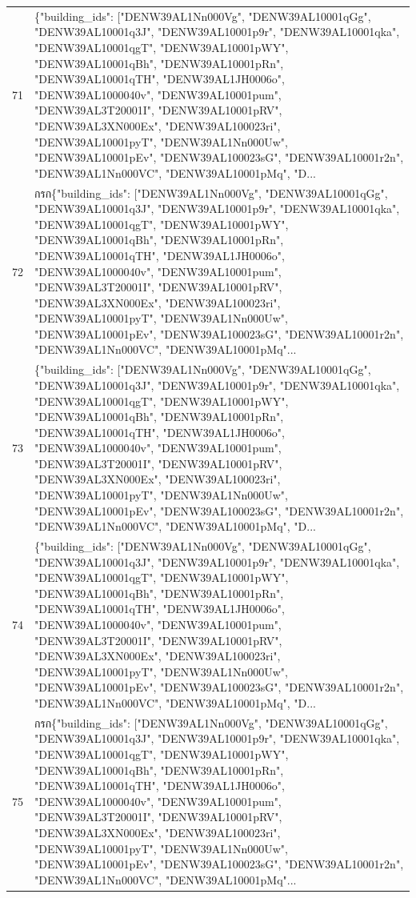 \documentclass[a4paper,11pt]{article}
\begin{document}
\begin{table}[ht]
\begin{tabular}{r p{12cm}}
71 & \{"building\_ids": ["DENW39AL1Nn000Vg", "DENW39AL10001qGg", "DENW39AL10001q3J", "DENW39AL10001p9r", "DENW39AL10001qka", "DENW39AL10001qgT", "DENW39AL10001pWY", "DENW39AL10001qBh", "DENW39AL10001pRn", "DENW39AL10001qTH", "DENW39AL1JH0006o", "DENW39AL1000040v", "DENW39AL10001pum", "DENW39AL3T20001I", "DENW39AL10001pRV", "DENW39AL3XN000Ex", "DENW39AL100023ri", "DENW39AL10001pyT", "DENW39AL1Nn000Uw", "DENW39AL10001pEv", "DENW39AL100023sG", "DENW39AL10001r2n", "DENW39AL1Nn000VC", "DENW39AL10001pMq", "D... \\
72 &  กรก\{"building\_ids": ["DENW39AL1Nn000Vg", "DENW39AL10001qGg", "DENW39AL10001q3J", "DENW39AL10001p9r", "DENW39AL10001qka", "DENW39AL10001qgT", "DENW39AL10001pWY", "DENW39AL10001qBh", "DENW39AL10001pRn", "DENW39AL10001qTH", "DENW39AL1JH0006o", "DENW39AL1000040v", "DENW39AL10001pum", "DENW39AL3T20001I", "DENW39AL10001pRV", "DENW39AL3XN000Ex", "DENW39AL100023ri", "DENW39AL10001pyT", "DENW39AL1Nn000Uw", "DENW39AL10001pEv", "DENW39AL100023sG", "DENW39AL10001r2n", "DENW39AL1Nn000VC", "DENW39AL10001pMq"... \\
73 & \{"building\_ids": ["DENW39AL1Nn000Vg", "DENW39AL10001qGg", "DENW39AL10001q3J", "DENW39AL10001p9r", "DENW39AL10001qka", "DENW39AL10001qgT", "DENW39AL10001pWY", "DENW39AL10001qBh", "DENW39AL10001pRn", "DENW39AL10001qTH", "DENW39AL1JH0006o", "DENW39AL1000040v", "DENW39AL10001pum", "DENW39AL3T20001I", "DENW39AL10001pRV", "DENW39AL3XN000Ex", "DENW39AL100023ri", "DENW39AL10001pyT", "DENW39AL1Nn000Uw", "DENW39AL10001pEv", "DENW39AL100023sG", "DENW39AL10001r2n", "DENW39AL1Nn000VC", "DENW39AL10001pMq", "D... \\
74 & \{"building\_ids": ["DENW39AL1Nn000Vg", "DENW39AL10001qGg", "DENW39AL10001q3J", "DENW39AL10001p9r", "DENW39AL10001qka", "DENW39AL10001qgT", "DENW39AL10001pWY", "DENW39AL10001qBh", "DENW39AL10001pRn", "DENW39AL10001qTH", "DENW39AL1JH0006o", "DENW39AL1000040v", "DENW39AL10001pum", "DENW39AL3T20001I", "DENW39AL10001pRV", "DENW39AL3XN000Ex", "DENW39AL100023ri", "DENW39AL10001pyT", "DENW39AL1Nn000Uw", "DENW39AL10001pEv", "DENW39AL100023sG", "DENW39AL10001r2n", "DENW39AL1Nn000VC", "DENW39AL10001pMq", "D... \\
75 &  กรก\{"building\_ids": ["DENW39AL1Nn000Vg", "DENW39AL10001qGg", "DENW39AL10001q3J", "DENW39AL10001p9r", "DENW39AL10001qka", "DENW39AL10001qgT", "DENW39AL10001pWY", "DENW39AL10001qBh", "DENW39AL10001pRn", "DENW39AL10001qTH", "DENW39AL1JH0006o", "DENW39AL1000040v", "DENW39AL10001pum", "DENW39AL3T20001I", "DENW39AL10001pRV", "DENW39AL3XN000Ex", "DENW39AL100023ri", "DENW39AL10001pyT", "DENW39AL1Nn000Uw", "DENW39AL10001pEv", "DENW39AL100023sG", "DENW39AL10001r2n", "DENW39AL1Nn000VC", "DENW39AL10001pMq"... \\

\end{tabular}
\end{table}
\end{document}
